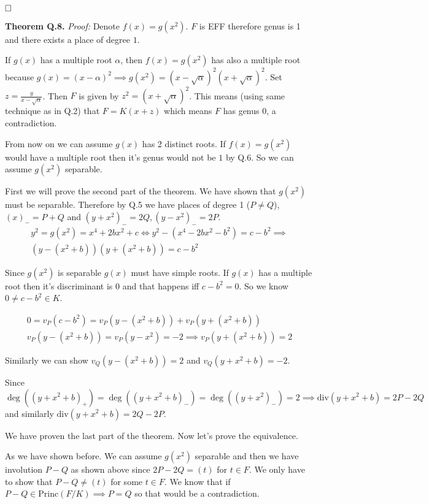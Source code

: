 \documentclass[12pt, a4paper]{article}
\newcommand{\qed}{\hfill\square}
\begin{document}
$\qed$

\textbf{Theorem Q.8.} \textit{Proof:}
Denote $f(x) = g(x^2)$. $F$ is EFF therefore genus is 1 and there exists a place of degree $1$.

If $g(x)$ has a multiple root $\alpha$, then $f(x)=g(x^2)$ has also a multiple root because $g(x)=(x-\alpha)^2 \implies g(x^2) = (x-\sqrt{\alpha})^2(x+\sqrt{\alpha})^2$. Set $z = \frac{y}{x-\sqrt{\alpha}}$. Then $F$ is given by $z^2=(x+\sqrt{\alpha})^2$. This means (using same technique as in Q.2) that $F = K(x+z)$ which means $F$ has genus 0, a contradiction.

From now on we can assume $g(x)$ has 2 distinct roots. If $f(x)=g(x^2)$ would have a multiple root then it's genus would not be $1$ by Q.6. So we can assume $g(x^2)$ separable. 

First we will prove the second part of the theorem. We have shown that $g(x^2)$ must be separable. Therefore by Q.5 we have places of degree 1 ($P\neq Q$), $(x)_{-} = P+Q$ and $(y+x^2)_{-}=2Q, (y-x^2)_{-} = 2P$.
\begin{gather*}
y^2=g(x^2) = x^4+2bx^2+c \iff y^2-(x^4-2bx^2-b^2) = c - b^2 \implies \\
(y-(x^2+b))(y+(x^2+b))=c-b^2
\end{gather*}

Since $g(x^2)$ is separable $g(x)$ must have simple roots. If $g(x)$ has a multiple root then it's discriminant is 0 and that happens iff $c-b^2=0$. So we know $0 \neq c-b^2 \in K$.

\begin{gather*}
0=v_P(c-b^2)=v_P(y-(x^2+b)) + v_P(y+(x^2+b))\\
v_P(y-(x^2+b)) = v_P(y-x^2) = -2 \implies v_P(y+(x^2+b)) = 2
\end{gather*}

Similarly we can show $v_Q(y-(x^2+b)) = 2$ and $v_Q(y+x^2+b)=-2$. 

Since $\deg((y+x^2+b)_{+}) = \deg((y+x^2+b)_{-}) = \deg((y+x^2)_{-}) = 2 \implies \text{div}(y+x^2+b) = 2P - 2Q$ and similarly $\text{div}(y+x^2+b) = 2Q - 2P$.

We have proven the last part of the theorem. Now let's prove the equivalence.

As we have shown before. We can assume $g(x^2)$ separable and then we have involution $P-Q$ as shown above since $2P-2Q = (t)$ for $t \in F$. We only have to show that $P-Q \neq (t)$ for some $t \in F$. We know that if $P-Q \in \text{Princ}(F/K) \implies P=Q$ so that would be a contradiction. 
\end{document}
